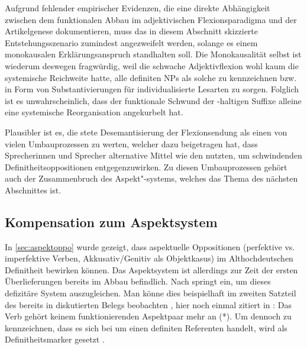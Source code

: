 Aufgrund fehlender empirischer Evidenzen, die eine direkte Abhängigkeit zwischen dem funktionalen Abbau im adjektivischen Flexionsparadigma   und der Artikelgenese dokumentieren, muss das in diesem Abschnitt skizzierte Entstehungsszenario  zumindest angezweifelt werden, solange es einem monokausalen Erklärungsanspruch standhalten soll. Die Monokausalität selbst ist wiederum deswegen fragwürdig, weil  die schwache Adjektivflexion   wohl kaum die systemische Reichweite hatte,  alle definiten NPs als solche zu kennzeichnen bzw. in Form von Substantivierungen  für individualisierte  Lesarten zu sorgen. Folglich ist es unwahrscheinlich, dass der funktionale Schwund der -haltigen Suffixe  alleine eine systemische Reorganisation angekurbelt hat. 

Plausibler ist es, die stete Desemantisierung der Flexionsendung als einen von vielen Umbauprozessen zu werten, welcher dazu beigetragen hat, dass Sprecherinnen und Sprecher alternative Mittel wie den  nutzten, um schwindenden Definitheitsoppositionen  entgegenzuwirken. Zu diesen Umbauprozessen gehört auch der Zusammenbruch des  Aspekt"-systems, welches das Thema des nächsten Abschnittes ist.

\subsection{Kompensation zum Aspektsystem} \label{aspekt}

In \ref{sec:aspektoppo} wurde gezeigt, dass aspektuelle  Oppositionen (perfektive vs. imperfektive Verben, Akkusativ/Genitiv als Objektkasus)  im Althochdeutschen De\-fi\-nit\-heit bewirken können. Das Aspektsystem  ist allerdings zur Zeit der ersten Überlieferungen bereits im Abbau befindlich. Nach  \textcite{Leiss1994,Leiss2000,Leiss2010} springt  ein, um dieses defizitäre System auszugleichen. Man könne dies beispielhaft im zweiten Satzteil des bereits in  diskutierten Belegs beobachten \parencite[180--181]{Leiss2000}, hier noch einmal zitiert in : Das Verb  gehört keinem funktionierenden Aspektpaar  mehr an (*). Um dennoch zu kennzeichnen, dass es sich bei  um einen definiten Referenten handelt, wird  als Definitheitsmarker  gesetzt \parencite[181]{Leiss2000}.


